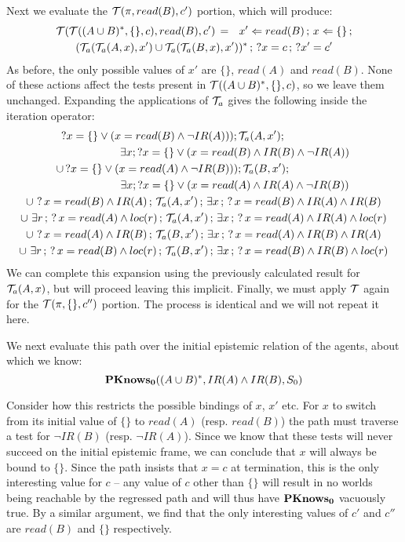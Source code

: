 Next we evaluate the $\mathcal{T}(\pi,read(B),c')$ portion, which will produce:\begin{multline*}
\mathcal{T}(\mathcal{T}((A\cup B)^{*},\{\},c),read(B),c')\,=\,\,\,\, x'\Leftarrow read(B)\,;\, x\Leftarrow\{\}\,;\\
(\mathcal{T}_{a}(\mathcal{T}_{a}(A,x),x')\cup\mathcal{T}_{a}(\mathcal{T}_{a}(B,x),x'))^{*}\,;\,?x=c\,;\,?x'=c'\end{multline*}
 As before, the only possible values of $x'$ are $\{\}$, $read(A)$
and $read(B)$. None of these actions affect the tests present in
$\mathcal{T}((A\cup B)^{*},\{\},c)$, so we leave them unchanged. Expanding
the applications of $\mathcal{T}_{a}$ gives the following inside the iteration
operator: \begin{multline*}
?x=\{\}\vee(x=read(B)\wedge\neg IR(A)));\mathcal{T}_{a}(A,x');\,\,\,\,\,\,\,\,\,\,\,\,\,\,\,\,\,\,\,\,\,\,\,\,\,\,\,\,\,\,\,\,\,\,\\
\,\,\,\,\,\,\,\,\,\,\,\,\,\,\,\,\,\,\,\,\,\,\,\,\,\,\,\,\,\,\,\,\,\,\exists x;?x=\{\}\vee(x=read(B)\wedge IR(B)\wedge\neg IR(A))\\
\cup\,?x=\{\}\vee(x=read(A)\wedge\neg IR(B)));\mathcal{T}_{a}(B,x');\,\,\,\,\,\,\,\,\,\,\,\,\,\,\,\,\,\,\,\,\,\,\,\,\,\,\,\,\,\,\,\,\,\,\\
\,\,\,\,\,\,\,\,\,\,\,\,\,\,\,\,\,\,\,\,\,\,\,\,\,\,\,\,\,\,\,\,\,\,\exists x;?x=\{\}\vee(x=read(A)\wedge IR(A)\wedge\neg IR(B))\\
\cup\,\,?\, x=read(B)\wedge IR(A)\,;\,\mathcal{T}_{a}(A,x')\,;\,\exists x\,;\,?\, x=read(B)\wedge IR(A)\wedge IR(B)\\
\cup\,\,\exists r\,;\,?\, x=read(A)\wedge loc(r)\,;\,\mathcal{T}_{a}(A,x')\,;\,\exists x\,;\,?\, x=read(A)\wedge IR(A)\wedge loc(r)\\
\cup\,\,?\, x=read(A)\wedge IR(B)\,;\,\mathcal{T}_{a}(B,x')\,;\,\exists x\,;\,?\, x=read(A)\wedge IR(B)\wedge IR(A)\\
\cup\,\,\exists r\,;\,?\, x=read(B)\wedge loc(r)\,;\,\mathcal{T}_{a}(B,x')\,;\,\exists x\,;\,?\, x=read(B)\wedge IR(B)\wedge loc(r)\end{multline*}
 We can complete this expansion using the previously calculated result
for $\mathcal{T}_{a}(A,x)$, but will proceed leaving this implicit. Finally,
we must apply $\mathcal{T}$ again for the $\mathcal{T}(\pi,\{\},c'')$ portion.
The process is identical and we will not repeat it here.

We next evaluate this path over the initial epistemic relation of
the agents, about which we know:\[
\mathbf{PKnows_{0}}((A\cup B)^{*},IR(A)\wedge IR(B),S_{0})\]


Consider how this restricts the possible bindings of $x$, $x'$ etc.
For $x$ to switch from its initial value of $\{\}$ to $read(A)$
(resp. $read(B)$) the path must traverse a test for $\neg IR(B)$
(resp. $\neg IR(A)$). Since we know that these tests will never succeed
on the initial epistemic frame, we can conclude that $x$ will always
be bound to $\{\}$. Since the path insists that $x=c$ at termination,
this is the only interesting value for $c$ -- any value of $c$ other
than $\{\}$ will result in no worlds being reachable by the regressed
path and will thus have $\mathbf{PKnows_{0}}$ vacuously true. By a similar argument,
we find that the only interesting values of $c'$ and $c''$ are $read(B)$
and $\{\}$ respectively.


